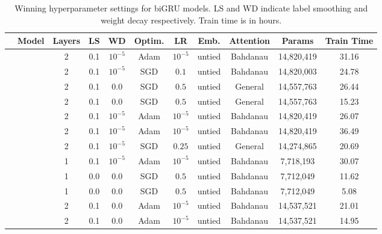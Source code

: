 \begin{table*}
\center
\begin{tabular}{clccc ccc ccc}
\toprule
&Model & Layers & LS & WD & Optim. & LR & Emb. & Attention & Params & Train Time \\
\midrule
    \parbox[t]{2mm}{} 
 &  & 2 & 0.1 & $10^{-5}$ & Adam & $10^{-5}$ & untied & Bahdanau & 14,820,419 & 31.16 \\
 &  & 2 & 0.1 & $10^{-5}$ & SGD & $0.1$ & untied & Bahdanau & 14,820,003 & 24.78\\ 
 &  & 2 & 0.1 & $0.0$ & SGD & $0.5$ & untied & General & 14,557,763 & 26.44 \\
 &  & 2 & 0.1 & $0.0$ & SGD & $0.5$ & untied & General & 14,557,763 & 15.23 \\
 &  & 2 & 0.1 & $10^{-5}$ & Adam & $10^{-5}$ & untied & Bahdanau & 14,820,419 & 26.07 \\
 &  & 2 & 0.1 & $10^{-5}$ & Adam & $10^{-5}$ & untied & Bahdanau & 14,820,419 & 36.49 \\
\midrule
    \parbox[t]{2mm}{} 
 &  & 2 & 0.1 & $10^{-5}$ & SGD & $0.25$ & untied & General & 14,274,865 & 20.69 \\
 &  & 1 & 0.1 & $10^{-5}$ & Adam & $10^{-5}$ & untied & Bahdanau & 7,718,193 & 30.07\\ 
 &  & 1 & 0.0 & $0.0$ & SGD & $0.5$ & untied & Bahdanau & 7,712,049 & 11.62\\ 
 &  & 1 & 0.0 & $0.0$ & SGD & $0.5$ & untied & Bahdanau & 7,712,049 & 5.08\\ 
 &  & 2 & 0.1 & $0.0$ & Adam & $10^{-5}$ & untied & Bahdanau & 14,537,521 & 21.01\\ 
 &  & 2 & 0.1 & $0.0$ & Adam & $10^{-5}$ & untied & Bahdanau & 14,537,521 & 14.95\\ 
\bottomrule
\end{tabular}

\caption{Winning hyperparameter settings for biGRU models. LS and WD indicate label smoothing and weight decay respectively. Train time is in hours.}
\label{tab:gruparams}
\end{table*}
